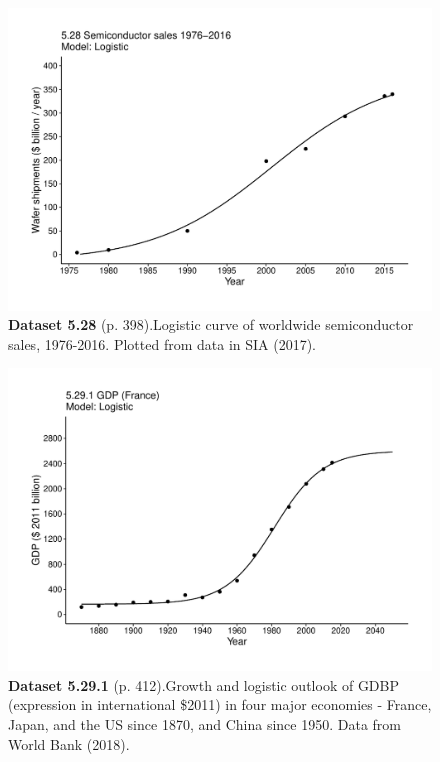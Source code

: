 \documentclass[aps,rmp,preprint,superscriptaddress,10pt,onecolumn]{article}
\begin{document}
\clearpage
\begin{figure}[h]
\includegraphics[width=\textwidth]{output/figs-ggplot/5.28.pdf}
\caption*{\textbf{Dataset 5.28} (p. 398).Logistic curve of worldwide semiconductor sales, 1976-2016. Plotted from data in SIA (2017).}
\end{figure}
	
\clearpage
\begin{figure}[h]
\includegraphics[width=\textwidth]{output/figs-ggplot/5.29.1.pdf}
\caption*{\textbf{Dataset 5.29.1} (p. 412).Growth and logistic outlook of GDBP (expression in international \$2011) in four major economies - France, Japan, and the US since 1870, and China since 1950. Data from World Bank (2018).}
\end{figure}
	
\end{document}
